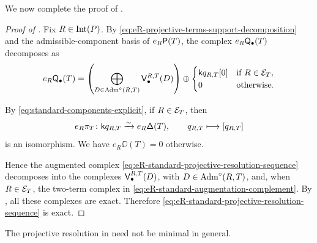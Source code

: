 We now complete the proof of
.


\begin{proof}[Proof of ]
Fix $R\in\operatorname{Int}(P)$. 
By \eqref{eq:eR-projective-terms-support-decomposition} and the
admissible-component basis of $e_R\mathsf P(T)$, the complex
$e_R\mathsf Q_\bullet(T)$ decomposes as
\begin{equation}
e_R\mathsf Q_\bullet(T)
=
\left(
\bigoplus_{D\in\operatorname{Adm}^\circ(R,T)}
\mathsf V_\bullet^{R,T}(D)
\right)
\oplus
\begin{cases}
\mathsf{k} q_{R,T}[0]
& \text{if } R\in\mathcal E_T,\\
0
& \text{otherwise}.
\end{cases}
\label{eq:eR-projective-complex-support-decomposition}
\end{equation}


By \eqref{eq:standard-components-explicit}, if $R\in\mathcal E_T$, then
\begin{equation}
e_R\pi_T\colon
\mathsf{k} q_{R,T}
\xrightarrow{\sim}
e_R\mathsf\Delta(T),
\qquad
q_{R,T}\longmapsto[q_{R,T}]
\label{eq:eR-standard-augmentation-complement}
\end{equation}
is an isomorphism.
We have $e_R\DD(T)=0$ otherwise.

Hence the augmented complex
\eqref{eq:eR-standard-projective-resolution-sequence} decomposes into
the complexes $\mathsf V_\bullet^{R,T}(D)$, with
$D\in\operatorname{Adm}^\circ(R,T)$, and, when $R\in\mathcal E_T$, the two-term complex
in \eqref{eq:eR-standard-augmentation-complement}.
By , all these complexes
are exact. Therefore
\eqref{eq:eR-standard-projective-resolution-sequence} is exact.
\end{proof}


The projective resolution in
 need not be minimal in general.





